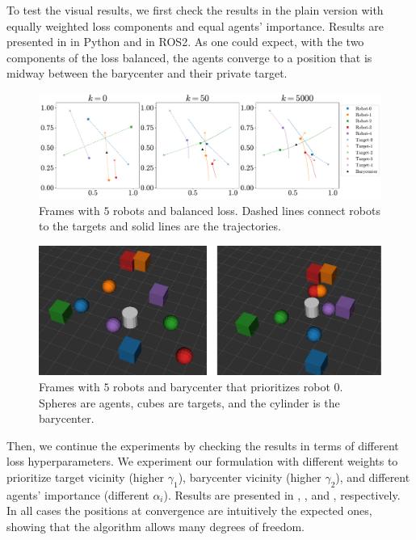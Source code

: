 \documentclass[a4paper,11pt,oneside]{book}
\begin{document}
To test the visual results, we first check the results in the plain version with equally weighted loss components and equal agents' importance. Results are presented in  in Python and  in ROS2. As one could expect, with the two components of the loss balanced, the agents converge to a position that is midway between the barycenter and their private target.
\begin{figure}[H]
      \centering
      \includegraphics[width=0.9\linewidth]{./figs/aggregative/plain_anim/anim.pdf} 
      \caption{Frames with $5$ robots and balanced loss. Dashed lines connect robots to the targets and solid lines are the trajectories.}
      \label{fig:anim_plain}
\end{figure}

\begin{figure}[H]
      \centering
      \includegraphics[width=0.75\linewidth]{./figs/aggregative/plain_anim/ros2.png} 
      \caption{Frames with $5$ robots and barycenter that prioritizes robot $0$. Spheres are agents, cubes are targets, and the cylinder is the barycenter.}
      \label{fig:anim_plain_ros2}
\end{figure}

Then, we continue the experiments by checking the results in terms of different loss hyperparameters. We experiment our formulation with different weights to prioritize target vicinity (higher $\gamma_1$), barycenter vicinity (higher $\gamma_2$), and different agents' importance (different $\alpha_i$). Results are presented in , , and , respectively. In all cases the positions at convergence are intuitively the expected ones, showing that the algorithm allows many degrees of freedom.
\end{document}
